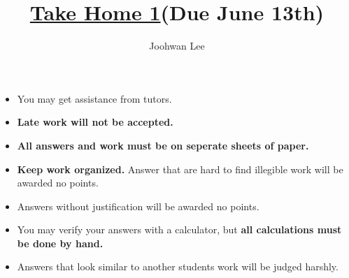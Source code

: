\documentclass[10pt,letterpaper]{article}
\author{Joohwan Lee}
\title{\underline{Take Home 1}{\tiny {\bf (Due June 13th)}}}
\date{}
\begin{document}
\makeatletter
\renewcommand{\@maketitle}{
\newpage
 \null
 \vskip 2em%
 \begin{center}%
  {\LARGE \@title \par}%
 \end{center}%
 \par} \makeatother
\maketitle


\begin{itemize}[noitemsep]
\item You may get assistance from tutors.
\item {\bf Late work will not be accepted.}
\item {\bf All answers and work must be on seperate sheets of paper.}
\item {\bf Keep work organized.}  Answer that are hard to find illegible work will be awarded no points.
\item Answers without justification will be awarded no points.
\item You may verify your answers with a calculator, but {\bf all calculations must be done by hand.}
\item Answers that look similar to another students work will be judged harshly.
\end{itemize}
\end{document}
